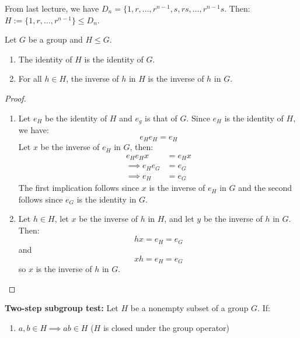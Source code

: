 \begin{itemize}
\begin{example}
        From last lecture, we have $D_n = \{1,r,\dots,r^{n-1},s,rs,\dots,r^{n-1}s$. Then: $H := \{1,r,\dots,r^{n-1}\} \leq D_n$.
    \end{example}
    \begin{proposition}
        Let $G$ be a group and $H \leq G$.
        \begin{enumerate}
            \item The identity of $H$ is the identity of $G$.
            \item For all $h\in H$, the inverse of $h$ in $H$ is the inverse of $h$ in $G$.
        \end{enumerate}
    \end{proposition}
    \begin{proof}
        \begin{enumerate}
            \item Let $e_H$ be the identity of $H$ and $e_g$ is that of $G$. Since $e_H$ is the identity of $H$, we have:
            \begin{equation}
                e_He_H = e_H
            \end{equation}
            Let $x$ be the inverse of $e_H$ in $G$, then:
            \begin{align}
                e_He_Hx &= e_H x \\ 
                \implies e_He_G &= e_G \\ 
                \implies e_H &= e_G
            \end{align}
            The first implication follows since $x$ is the inverse of $e_H$ in $G$ and the second follows since $e_G$ is the identity in $G$.
            \item Let $h \in H$, let $x$ be the inverse of $h$ in $H$, and let $y$ be the inverse of $h$ in $G$. Then:
            \begin{equation}
                hx = e_H = e_G
            \end{equation}
            and
            \begin{equation}
                xh = e_H = e_G
            \end{equation}
            so $x$ is the inverse of $h$ in $G$.
        \end{enumerate}
    \end{proof}
    \begin{theorem}
        \textbf{Two-step subgroup test:} Let $H$ be a nonempty subset of a group $G$. If:
        \begin{enumerate}
            \item $a,b \in H \implies ab \in H$ ($H$ is closed under the group operator)

\end{enumerate}
\end{theorem}
\end{itemize}
